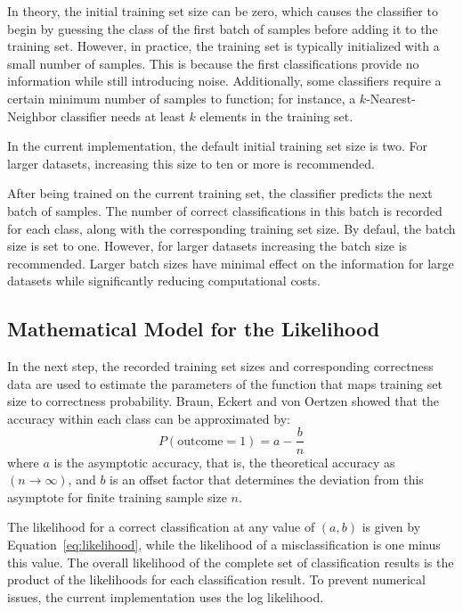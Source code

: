 \documentclass[man]{apa7}
\begin{document}
In theory, the initial training set size can be zero, which causes the classifier to begin by guessing the class of the first batch of samples before adding it to the training set. However, in practice, the training set is typically initialized with a small number of samples. This is because the first classifications provide no information while still introducing noise. Additionally, some classifiers require a certain minimum number of samples to function; for instance, a $k$-Nearest-Neighbor classifier needs at least $k$ elements in the training set.

In the current implementation, the default initial training set size is two. For larger datasets, increasing this size to ten or more is recommended.

After being trained on the current training set, the classifier predicts the next batch of samples. The number of correct classifications in this batch is recorded for each class, along with the corresponding training set size. By defaul, the batch size is set to one. However, for larger datasets increasing the batch size is recommended. Larger batch sizes have minimal effect on the information for large datasets while significantly reducing computational costs.

\subsection{Mathematical Model for the Likelihood} \label{sec:math_model}
In the next step, the recorded training set sizes and corresponding correctness data are used to estimate the parameters of the function that maps training set size to correctness probability. Braun, Eckert and von Oertzen \citep{braun_independent_2023} showed that the accuracy within each class can be approximated by:
%
\begin{equation} \label{eq:likelihood}
P(\mathrm{outcome} = 1) = a - \frac{b}{n}
\end{equation}
%
where $a$ is the asymptotic accuracy, that is, the theoretical accuracy as $(n \to \infty)$, and $b$ is an offset factor that determines the deviation from this asymptote for finite training sample size $n$.

The likelihood for a correct classification at any value of $(a,b)$ is given by Equation~\ref{eq:likelihood}, while the likelihood of a misclassification is one minus this value. The overall likelihood of the complete set of classification results is the product of the likelihoods for each classification result. To prevent numerical issues, the current implementation uses the log likelihood.
\end{document}
